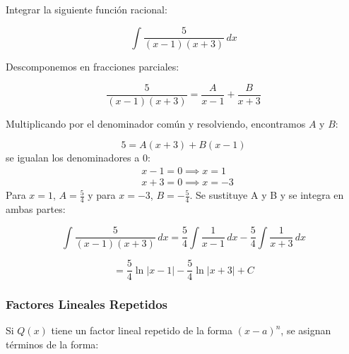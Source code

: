 \begin{example}
    Integrar la siguiente función racional:

\[
\int \frac{5}{(x - 1)(x + 3)} \, dx
\]

Descomponemos en fracciones parciales:

\[
\frac{5}{(x - 1)(x + 3)} = \frac{A}{x - 1} + \frac{B}{x + 3}
\]

Multiplicando por el denominador común y resolviendo, encontramos \( A \) y \( B \):

\[
5 = A(x + 3) + B(x - 1)
\]
se igualan los denominadores a 0:
\begin{align*}
    &x - 1 = 0\implies x = 1\\
    &x + 3 = 0\implies x = - 3
\end{align*}
Para \( x = 1 \), \( A = \frac{5}{4} \) y para \( x = -3 \), \( B = -\frac{5}{4} \). Se sustituye A y B y se integra en ambas partes:

\[
\int \frac{5}{(x - 1)(x + 3)} \, dx = \frac{5}{4} \int \frac{1}{x - 1} \, dx - \frac{5}{4} \int \frac{1}{x + 3} \, dx
\]

\[
= \frac{5}{4} \ln |x - 1| - \frac{5}{4} \ln |x + 3| + C
\]
\end{example}

\subsubsection{Factores Lineales Repetidos}
Si \( Q(x) \) tiene un factor lineal repetido de la forma \( (x - a)^n \), se asignan términos de la forma:

